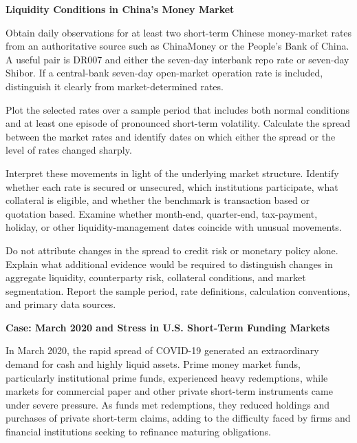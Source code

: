 \textbf{Liquidity Conditions in China's Money Market}

Obtain daily observations for at least two short-term Chinese money-market rates from an authoritative source such as ChinaMoney or the People's Bank of China. A useful pair is DR007 and either the seven-day interbank repo rate or seven-day Shibor. If a central-bank seven-day open-market operation rate is included, distinguish it clearly from market-determined rates.

Plot the selected rates over a sample period that includes both normal conditions and at least one episode of pronounced short-term volatility. Calculate the spread between the market rates and identify dates on which either the spread or the level of rates changed sharply.

Interpret these movements in light of the underlying market structure. Identify whether each rate is secured or unsecured, which institutions participate, what collateral is eligible, and whether the benchmark is transaction based or quotation based. Examine whether month-end, quarter-end, tax-payment, holiday, or other liquidity-management dates coincide with unusual movements.

Do not attribute changes in the spread to credit risk or monetary policy alone. Explain what additional evidence would be required to distinguish changes in aggregate liquidity, counterparty risk, collateral conditions, and market segmentation. Report the sample period, rate definitions, calculation conventions, and primary data sources.




\textbf{Case: March 2020 and Stress in U.S. Short-Term Funding Markets}

In March 2020, the rapid spread of COVID-19 generated an extraordinary demand for cash and highly liquid assets. Prime money market funds, particularly institutional prime funds, experienced heavy redemptions, while markets for commercial paper and other private short-term instruments came under severe pressure. As funds met redemptions, they reduced holdings and purchases of private short-term claims, adding to the difficulty faced by firms and financial institutions seeking to refinance maturing obligations.

